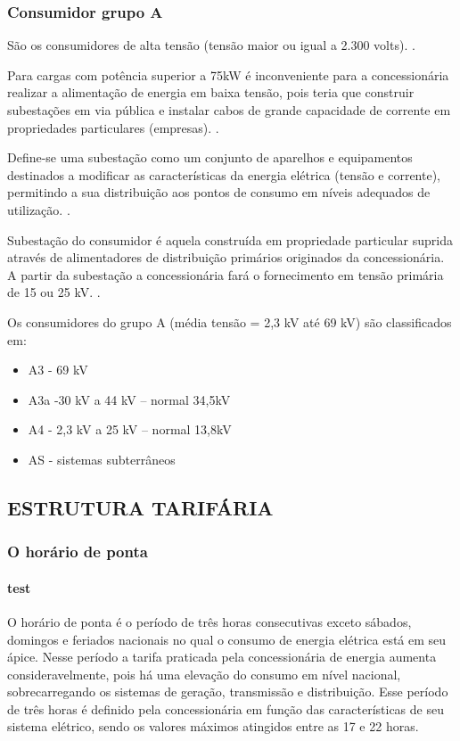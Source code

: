 \subsubsection{Consumidor grupo A}

São os consumidores de alta tensão (tensão maior ou igual a 2.300 volts). \cite{procel}.

Para cargas com potência superior a 75kW é inconveniente para a concessionária realizar a alimentação de energia em baixa tensão, pois teria que construir subestações em via pública e instalar cabos de grande capacidade de corrente em propriedades particulares (empresas). \cite{procel}.

Define-se uma subestação como um conjunto de aparelhos e equipamentos destinados a modificar as características da energia elétrica (tensão e corrente), permitindo a sua distribuição aos pontos de consumo em níveis adequados de utilização. \cite{procel}.

Subestação do consumidor é aquela construída em propriedade particular suprida através de alimentadores de distribuição primários originados da concessionária. A partir da subestação a concessionária fará o fornecimento em tensão primária de 15 ou 25 kV. \cite{procel}.

Os consumidores do grupo A (média tensão = 2,3 kV até 69 kV) são classificados em:

\begin{itemize}
    \item A3 - 69 kV
    \item A3a -30 kV a 44 kV – normal 34,5kV
    \item A4 - 2,3 kV a 25 kV – normal 13,8kV
    \item AS - sistemas subterrâneos
\end{itemize}

\subsection{ESTRUTURA TARIFÁRIA}

\subsubsection{O horário de ponta}

\paragraph{test}

\hspace*{0.8cm}O  horário  de  ponta  é  o  período  de  três  horas  consecutivas  exceto  sábados, domingos e feriados nacionais no qual o consumo de energia elétrica está em seu ápice. 
    Nesse  período  a  tarifa  praticada  pela  concessionária  de  energia  aumenta consideravelmente,  pois  há  uma  elevação  do  consumo  em  nível  nacional, sobrecarregando os sistemas de geração, transmissão e distribuição. Esse período de três horas  é  definido  pela  concessionária  em  função  das  características  de  seu  sistema elétrico,  sendo  os  valores  máximos  atingidos  entre  as  17  e  22  horas. \cite{costa}

